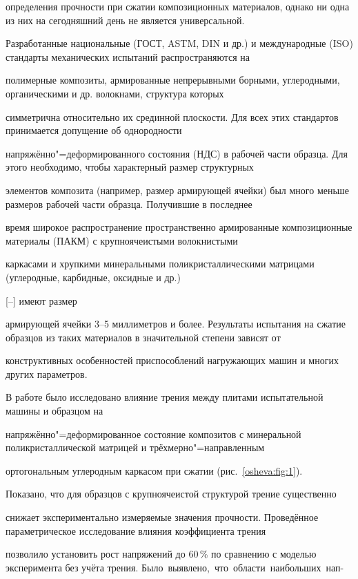 определения прочности при сжатии композиционных материалов, однако ни одна из них на сегодняшний день не является универсальной.

Разработанные национальные (ГОСТ, ASTM, DIN и др.) и международные (ISO) стандарты механических испытаний распространяются на

полимерные композиты, армированные непрерывными борными, углеродными, органическими и др. волокнами, структура которых

симметрична относительно их срединной плоскости. Для всех этих стандартов принимается допущение об однородности

напряжённо"=деформированного состояния (НДС) в рабочей части образца. Для этого необходимо, чтобы характерный размер структурных

элементов композита (например, размер армирующей ячейки) был много меньше размеров рабочей части образца. Получившие в последнее

время широкое распространение пространственно армированные композиционные материалы (ПАКМ) с крупноячеистыми волокнистыми

каркасами и хрупкими минеральными поликристаллическими матрицами (углеродные, карбидные, оксидные и др.) 

[--] имеют размер

армирующей ячейки 3--5 миллиметров и более. Результаты испытания на сжатие образцов из таких материалов в значительной степени зависят от

конструктивных особенностей приспособлений нагружающих машин и многих других параметров.



В работе \cite{osheva:bib4} было исследовано влияние трения между плитами испытательной машины и образцом на

напряжённо"=деформированное состояние композитов с минеральной поликристаллической матрицей и трёхмерно"=направленным

ортогональным углеродным каркасом при сжатии (рис.~\ref{osheva:fig:1}). 

Показано, что для образцов с крупноячеистой структурой трение существенно

снижает экспериментально измеряемые значения прочности. Проведённое параметрическое исследование влияния коэффициента трения

позволило установить рост напряжений до 60\,{\%} по сравнению с моделью эксперимента без учёта трения. \mbox{Было выявлено, что области наибольших нап-} 





